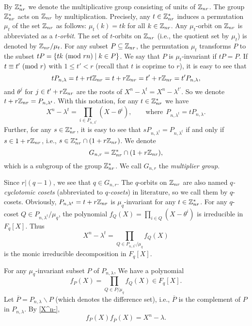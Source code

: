 \documentclass{article}
\numberwithin{equation}{section}
\numberwithin{table}{section}
\def\Z{{\Bbb Z}}
\begin{document}
By $\Z_{nr}^*$ we denote the multiplicative group
consisting of units of $\Z_{nr}$. 
The group $\Z_{nr}^*$ acts on $\Z_{nr}$ by multiplication.
Precisely, any $t\in\Z_{nr}^*$ induces a permutation $\mu_t$
of the set $\Z_{nr}$ as follows: $\mu_t(k)=tk$ for all $k\in \Z_{nr}$.
Any $\mu_t$-orbit on $\Z_{nr}$ is abbreviated as a {\em $t$-orbit}.
The set of $t$-orbits on $\Z_{nr}$ (i.e., the quotient set by $\mu_t$)
is denoted by $\Z_{nr}/\mu_t$.
For any subset $P\subseteq \Z_{nr}$, the permutation $\mu_t$
transforms $P$ to the subset
$tP=\{tk~({\rm mod}~rn)\mid k\in P\}$.
We say that $P$ is $\mu_t$-invariant if $tP=P$.
If $t\equiv t'~({\rm mod}~r)$ with $1\le t'<r$
(recall that $t$ is coprime to $r$), it is easy to see that
$$tP_{n,\lambda}
=t+rt\Z_{nr}=t+r\Z_{nr}=t'+r\Z_{nr}=t'P_{n,\lambda},$$
and $\theta^j$ for $j\in t'+r\Z_{nr}$ are the roots of
$X^n-\lambda^t=X^n-\lambda^{t'}$.
So we denote $t+r\Z_{nr}=P_{n,\lambda^t}$. 
With this notation, for any $t\in\Z_{nr}^*$ we have
\begin{equation}\label{X^n-lambda^t}
 X^n-\lambda^t=\prod_{i\in P_{n,\lambda^t}}(X-\theta^i),\qquad
 \mbox{where}~~P_{n,\lambda^t}=tP_{n,\lambda}.
\end{equation}
Further, for any $s\in\Z_{nr}^*$, it is easy to see that
$sP_{n,\lambda^t}=P_{n,\lambda^t}$
if and only if $s\in 1+r\Z_{nr}$, i.e., $s\in\Z_{nr}^*\cap(1+r\Z_{nr})$.
We denote
\begin{equation}\label{G_n,r}
G_{n,r}=\Z_{nr}^*\cap(1+r\Z_{nr}),
\end{equation}
which is a subgroup of the group $\Z_{nr}^*$.
We call $G_{n,r}$ the {\em multiplier group}.

Since $r|(q-1)$,  we see that $q\in G_{n,r}$.
The $q$-orbits on  $\Z_{nr}$ are also named
{\em $q$-cyclotomic cosets} (abbreviated to {\em $q$-cosets}) in literature,
so we call them by $q$-cosets.
Obviously, $P_{n,\lambda^t}=t+r\Z_{nr}$
is $\mu_q$-invariant for any $t\in\Z_{nr}^*$. 
For any $q$-coset $Q\in P_{n,\lambda^t}/\mu_q$,
the polynomial $f_Q(X)=\prod_{i\in Q}(X-\theta^i)$ is irreducible
in $F_q[X]$. Thus
\begin{equation}\label{X^n-}
X^n-\lambda^t=\prod_{Q\in P_{n,\lambda^t}/\mu_q}f_{Q}(X)
\end{equation}
is the monic irreducible decomposition in $F_q[X]$.


For any $\mu_q$-invariant subset $P$ of $P_{n,\lambda}$,
We have a polynomial
$$f_P(X)=\prod\limits_{Q\in P/\mu_q}f_Q(X)\in F_q[X].$$
Let $\overline P=P_{n,\lambda}\backslash P$
(which denotes the difference set), i.e.,
$\overline P$ is the complement of $P$ in $P_{n,\lambda}$.
By \eqref{X^n-},
\begin{equation}\label{X^n-lambda}
 f_P(X)f_{\overline P}(X)=X^n-\lambda.
\end{equation}
\end{document}
